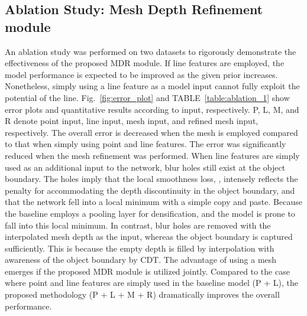 \subsection{Ablation Study: Mesh Depth Refinement module}\label{sec:exp_ablation}


An ablation study was performed on two datasets to \textcolor{color1}{rigorously demonstrate the effectiveness of} the proposed MDR \textcolor{color1}{module}. 
If line features are employed, the model performance is expected to be improved as the given prior increases. Nonetheless, simply using \textcolor{color1}{a} line feature as a model input \textcolor{color1}{cannot} fully \textcolor{color1}{exploit} the \textcolor{color1}{potential of the line}. 
Fig.~\ref{fig:error_plot} and TABLE~\ref{table:ablation_1} show error plots and quantitative results according to input, respectively. P, L, M, and R denote point input, line input, mesh input, and refined mesh input, respectively.
The overall error \textcolor{color1}{is decreased} when the mesh \textcolor{color1}{is} employed \textcolor{color1}{compared to that} when simply using point and line features. The error was \textcolor{color1}{significantly} reduced when \textcolor{color1}{the} mesh refinement was performed.
When line features are simply used as an additional input to the network, blur holes still exist at the object boundary. 
The holes imply that the local smoothness loss\textcolor{color1}{,} \textcolor{color1}{,} intensely reflect\textcolor{color1}{s} the penalty for accommodating the depth discontinuity \textcolor{color1}{in} the object boundary, and \textcolor{color1}{that} the network fell into a local minimum with a simple copy and paste. \textcolor{color1}{Because} the baseline employs a pooling layer for \textcolor{color1}{densification, and} the model \textcolor{color1}{is prone to} fall into this local minimum. 
In contrast, blur holes \textcolor{color1}{are} removed with the interpolated mesh depth as \textcolor{color1}{the} input\textcolor{color1}{, whereas} the object boundary \textcolor{color1}{is} captured sufficiently. \textcolor{color1}{This is because} the empty depth is filled \textcolor{color1}{by} interpolation with awareness of the object boundary \textcolor{color1}{by} CDT. 
The advantage of using \textcolor{color1}{a} mesh \textcolor{color1}{emerges} if the proposed MDR module is utilized jointly. Compared \textcolor{color1}{to} the case where point and line features \textcolor{color1}{are simply} used in the baseline model (P + L), the proposed methodology (P + L + M + R) dramatically improve\textcolor{color1}{s} the overall performance. 

